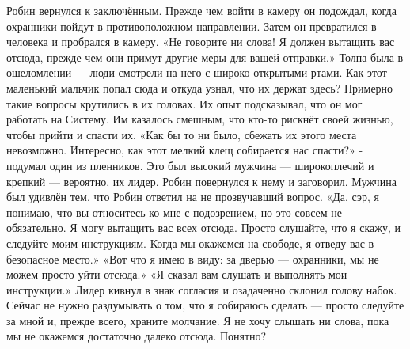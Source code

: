 \documentclass[a4paper,12pt]{book}
\begin{document}
	Робин вернулся к заключённым. Прежде чем войти в камеру он подождал, когда охранники пойдут в противоположном направлении. Затем он превратился в человека и пробрался в камеру.
	«Не говорите ни слова! Я должен вытащить вас отсюда, прежде чем они примут другие меры для вашей отправки.»
	Толпа была в ошеломлении — люди смотрели на него с широко открытыми ртами. Как этот маленький мальчик попал сюда и откуда узнал, что их держат здесь? Примерно такие вопросы крутились в их головах. Их опыт подсказывал, что он мог работать на Систему. Им казалось смешным, что кто-то рискнёт своей жизнью, чтобы прийти и спасти их.
	«Как бы то ни было, сбежать их этого места невозможно. Интересно, как этот мелкий клещ собирается нас спасти?» - подумал один из пленников. Это был высокий мужчина — широкоплечий и крепкий — вероятно, их лидер.
	Робин повернулся к нему и заговорил. Мужчина был удивлён тем, что Робин ответил на не прозвучавший вопрос.
	«Да, сэр, я понимаю, что вы относитесь ко мне с подозрением, но это совсем не обязательно. Я могу вытащить вас всех отсюда. Просто слушайте, что я скажу, и следуйте моим инструкциям. Когда мы окажемся на свободе, я отведу вас в безопасное место.»
	«Вот что я имею в виду: за дверью — охранники, мы не можем просто уйти отсюда.»
	«Я сказал вам слушать и выполнять мои инструкции.»
	Лидер кивнул в знак согласия и озадаченно склонил голову набок.
	Сейчас не нужно раздумывать о том, что я собираюсь сделать — просто следуйте за мной и, прежде всего, храните молчание. Я не хочу слышать ни слова, пока мы не окажемся достаточно далеко отсюда. Понятно?
\end{document}
